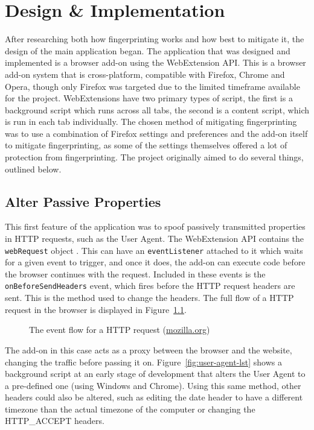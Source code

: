 \chapter{Design \& Implementation}

After researching both how fingerprinting works and how best to mitigate it, the design of the main application began.
The application that was designed and implemented is a browser add-on using the WebExtension API\@.
This is a browser add-on system that is cross-platform, compatible with Firefox, Chrome and Opera, though only Firefox was targeted due to the limited timeframe available for the project.
WebExtensions have two primary types of script, the first is a background script which runs across all tabs, the second is a content script, which is run in each tab individually.
The chosen method of mitigating fingerprinting was to use a combination of Firefox settings and preferences and the add-on itself to mitigate fingerprinting, as some of the settings themselves offered a lot of protection from fingerprinting.
The project originally aimed to do several things, outlined below.

\section{Alter Passive Properties}

This first feature of the application was to spoof passively transmitted properties in HTTP requests, such as the User Agent.
The WebExtension API contains the \texttt{webRequest} object \citep{webRequest}.
This can have an \texttt{eventListener} attached to it which waits for a given event to trigger, and once it does, the add-on can execute code before the browser continues with the request.
Included in these events is the \texttt{onBeforeSendHeaders} event, which fires before the HTTP request headers are sent.
This is the method used to change the headers.
The full flow of a HTTP request in the browser is displayed in Figure~\ref{fig:webRequest-flow}.

\begin{figure}[h]
\centering
\caption{The event flow for a HTTP request (\url{mozilla.org})}
\label{fig:webRequest-flow}
\end{figure}

The add-on in this case acts as a proxy between the browser and the website, changing the traffic before passing it on.
Figure~\ref{fig:user-agent-lst} shows a background script at an early stage of development that alters the User Agent to a pre-defined one (using Windows and Chrome).
Using this same method, other headers could also be altered, such as editing the date header to have a different timezone than the actual timezone of the computer or changing the HTTP\_ACCEPT headers.

